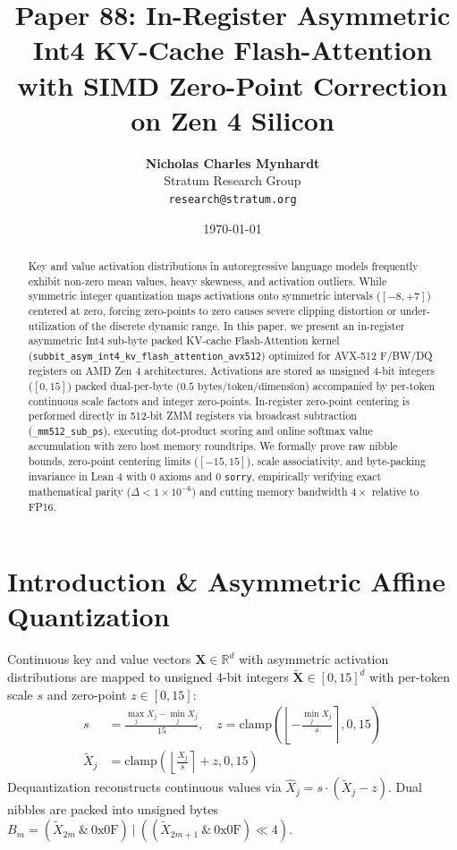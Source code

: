 \documentclass[11pt,a4paper]{article}
\title{\textbf{Paper 88: In-Register Asymmetric Int4 KV-Cache Flash-Attention with SIMD Zero-Point Correction on Zen 4 Silicon}}
\author{\textbf{Nicholas Charles Mynhardt} \\ Stratum Research Group \\ \texttt{research@stratum.org}}
\date{\today}
\begin{document}
\maketitle

\begin{abstract}
Key and value activation distributions in autoregressive language models frequently exhibit non-zero mean values, heavy skewness, and activation outliers. While symmetric integer quantization maps activations onto symmetric intervals ($[-8, +7]$) centered at zero, forcing zero-points to zero causes severe clipping distortion or under-utilization of the discrete dynamic range. In this paper, we present an in-register asymmetric Int4 sub-byte packed KV-cache Flash-Attention kernel (\texttt{subbit\_asym\_int4\_kv\_flash\_attention\_avx512}) optimized for AVX-512 F/BW/DQ registers on AMD Zen 4 architectures. Activations are stored as unsigned 4-bit integers ($[0, 15]$) packed dual-per-byte ($0.5\text{ bytes/token/dimension}$) accompanied by per-token continuous scale factors and integer zero-points. In-register zero-point centering is performed directly in 512-bit ZMM registers via broadcast subtraction (\texttt{\_mm512\_sub\_ps}), executing dot-product scoring and online softmax value accumulation with zero host memory roundtrips. We formally prove raw nibble bounds, zero-point centering limits ($[-15, 15]$), scale associativity, and byte-packing invariance in Lean 4 with 0 axioms and 0 \texttt{sorry}, empirically verifying exact mathematical parity ($\Delta < 1 \times 10^{-6}$) and cutting memory bandwidth $4\times$ relative to FP16.
\end{abstract}

\section{Introduction \& Asymmetric Affine Quantization}
Continuous key and value vectors $\mathbf{X} \in \mathbb{R}^d$ with asymmetric activation distributions are mapped to unsigned 4-bit integers $\tilde{\mathbf{X}} \in [0, 15]^d$ with per-token scale $s$ and zero-point $z \in [0, 15]$:
\begin{align}
s &= \frac{\max_j X_j - \min_j X_j}{15}, \quad z = \text{clamp}\left(\left\lfloor -\frac{\min_j X_j}{s} \right\rceil, 0, 15\right) \\
\tilde{X}_j &= \text{clamp}\left(\left\lfloor \frac{X_j}{s} \right\rceil + z, 0, 15\right)
\end{align}
Dequantization reconstructs continuous values via $\hat{X}_j = s \cdot (\tilde{X}_j - z)$. Dual nibbles are packed into unsigned bytes $B_m = (\tilde{X}_{2m} \ \& \ \text{0x0F}) \ | \ ((\tilde{X}_{2m+1} \ \& \ \text{0x0F}) \ll 4)$.
\end{document}
